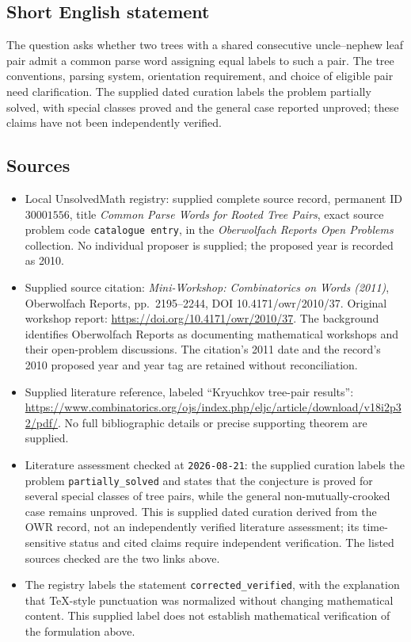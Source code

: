 \documentclass[11pt]{article}
\begin{document}
\subsection{Short English statement}
The question asks whether two trees with a shared consecutive uncle--nephew leaf pair admit a common parse word assigning equal labels to such a pair. The tree conventions, parsing system, orientation requirement, and choice of eligible pair need clarification. The supplied dated curation labels the problem partially solved, with special classes proved and the general case reported unproved; these claims have not been independently verified.
\subsection{Sources}
\begin{itemize}
\item Local UnsolvedMath registry: supplied complete source record, permanent ID \(30001556\), title \emph{Common Parse Words for Rooted Tree Pairs}, exact source problem code \texttt{catalogue entry}, in the \emph{Oberwolfach Reports Open Problems} collection. No individual proposer is supplied; the proposed year is recorded as 2010.
\item Supplied source citation: \emph{Mini-Workshop: Combinatorics on Words (2011)}, Oberwolfach Reports, pp.\ 2195--2244, DOI 10.4171/owr/2010/37. Original workshop report: \url{https://doi.org/10.4171/owr/2010/37}. The background identifies Oberwolfach Reports as documenting mathematical workshops and their open-problem discussions. The citation's 2011 date and the record's 2010 proposed year and year tag are retained without reconciliation.
\item Supplied literature reference, labeled ``Kryuchkov tree-pair results'': \url{https://www.combinatorics.org/ojs/index.php/eljc/article/download/v18i2p32/pdf/}. No full bibliographic details or precise supporting theorem are supplied.
\item Literature assessment checked at \texttt{2026-08-21}: the supplied curation labels the problem \texttt{partially\_solved} and states that the conjecture is proved for several special classes of tree pairs, while the general non-mutually-crooked case remains unproved. This is supplied dated curation derived from the OWR record, not an independently verified literature assessment; its time-sensitive status and cited claims require independent verification. The listed sources checked are the two links above.
\item The registry labels the statement \texttt{corrected\_verified}, with the explanation that TeX-style punctuation was normalized without changing mathematical content. This supplied label does not establish mathematical verification of the formulation above.
\end{itemize}
\end{document}
